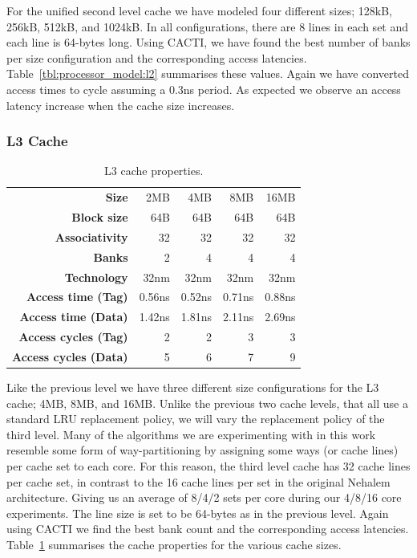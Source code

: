 For the unified second level cache we have modeled four different sizes; 128kB, 256kB, 512kB, and 1024kB. 
In all configurations, there are 8 lines in each set and each line is 64-bytes long.
Using CACTI, we have found the best number of banks per size configuration and the corresponding access latencies.
Table~\ref{tbl:processor_model:l2} summarises these values. 
Again we have converted access times to cycle assuming a 0.3ns period.
As expected we observe an access latency increase when the cache size increases.

\subsubsection{L3 Cache}
\begin{table}[ht]
\centering
\begin{tabular}{rrrrr}
\toprule
\bf{Size}                 & 2MB         & 4MB         & 8MB         & 16MB       \\
\bf{Block size}           & 64B         & 64B         & 64B         & 64B         \\
\bf{Associativity}        & 32          & 32          & 32          & 32             \\
\bf{Banks}                & 2           & 4           & 4           & 4           \\
\bf{Technology}           & 32nm        & 32nm        & 32nm        & 32nm    \\
\bf{Access time (Tag)}    & 0.56ns      & 0.52ns      & 0.71ns      & 0.88ns   \\
\bf{Access time (Data)}   & 1.42ns      & 1.81ns      & 2.11ns      & 2.69ns     \\
\bf{Access cycles (Tag)}  & 2           & 2           & 3           & 3             \\
\bf{Access cycles (Data)} & 5           & 6           & 7           & 9      \\
\bottomrule
\end{tabular}
\caption{L3 cache properties.}
\label{tbl:processor_model:l3}
\end{table}

Like the previous level we have three different size configurations for the L3 cache; 4MB, 8MB, and 16MB.
Unlike the previous two cache levels, that all use a standard LRU replacement policy, we will vary the replacement policy of the third level.
Many of the algorithms we are experimenting with in this work resemble some form of way-partitioning by assigning some ways (or cache lines) per cache set to each core.
For this reason, the third level cache has 32 cache lines per cache set, in contrast to the 16 cache lines per set in the original Nehalem architecture.
Giving us an average of 8/4/2 sets per core during our 4/8/16 core experiments.
The line size is set to be 64-bytes as in the previous level.
Again using CACTI we find the best bank count and the corresponding access latencies.
Table~\ref{tbl:processor_model:l3} summarises the cache properties for the various cache sizes.